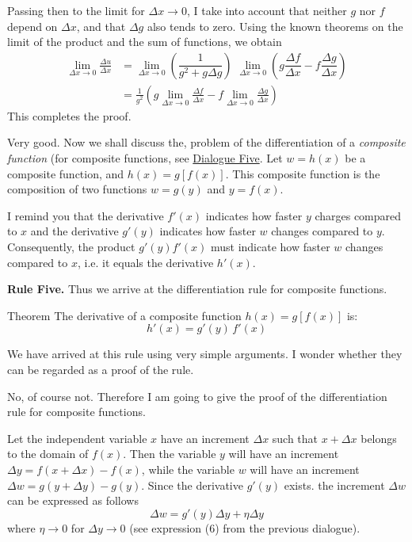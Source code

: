 Passing then to the limit for $\Delta x \to 0$, I take into account that neither $g$ nor $f$ depend on $\Delta x$, and that $\Delta g$ also tends to zero. Using the known theorems on the limit of the product and the sum of functions, we obtain
\begin{align*}%
\lim\limits_{\Delta x \to 0} \frac{\Delta u}{\Delta x} & = \lim\limits_{\Delta x \to 0} \left(\dfrac{ 1 }{g^{2} + g \Delta g}  \right) \,\, \lim\limits_{\Delta x \to 0} \left( g \dfrac{\Delta f}{\Delta x}  - f \dfrac{\Delta g}{\Delta x}  \right) \\
& = \frac{1}{g^{2}} \left( g \lim\limits_{\Delta x \to 0} \frac{\Delta f}{\Delta x} - 
f \lim\limits_{\Delta x \to 0} \frac{\Delta g}{\Delta x} \right)
\end{align*}
This completes the proof. 

\athr Very good. Now we shall discuss the, problem
of the differentiation of a \emph{composite function} (for composite functions, see \hyperref[more-on-function]{Dialogue Five}. Let $w = h (x)$ be a composite function, and $h (x) = g [f (x)]$. This composite function is the composition of two functions $w =	g (y)$ and $y  = f (x)$.

I remind you that the derivative $f' (x)$ indicates how faster $y$ charges compared to $x$ and the derivative $g' (y)$ indicates how faster $w$ changes compared to $y$.  Consequently, the product $g' (y) f' (x)$ must indicate how faster $w$ changes compared to $x$, i.e. it equals the derivative $h' (x)$.

\textbf{Rule Five.} Thus we arrive at the differentiation rule for
composite functions.
\begin{mytheo}{Theorem}
The derivative of a composite function $h (x) = g [f (x)]$ is:
\begin{equation}%
h' (x) = g' (y) \, f' (x)
 \label{deriv-comp}
\end{equation}
\end{mytheo}

\rdr We have arrived at this rule using very simple arguments. I wonder whether they can be regarded as a proof of the rule.

\athr No, of course not. Therefore I am going to give the proof of the differentiation rule for composite functions.

Let the independent variable $x$ have an increment $\Delta x$ such that $x + \Delta x$ belongs to the domain of $f (x)$. Then the variable $y$ will have an increment $\Delta y = f (x + \Delta x) - f (x)$, while the variable $w$ will have an increment $\Delta w = g (y + \Delta y) - g (y)$. Since the derivative $g' (y)$ exists.
the increment $\Delta w$ can be expressed as follows
\begin{equation*}%
\Delta w = g'(y) \Delta y + \eta \Delta y
\end{equation*}
where $\eta \to 0$ for $\Delta y \to 0$ (see expression (6) from the previous dialogue). 

